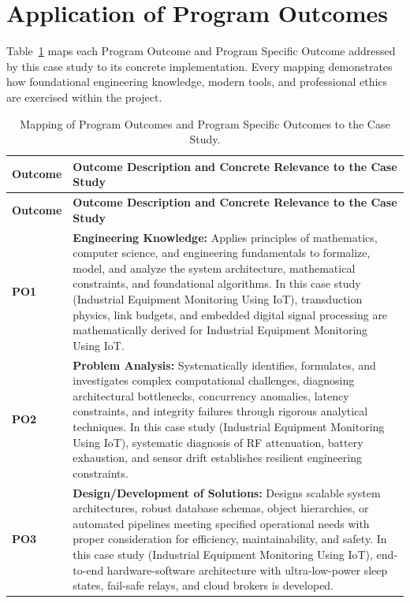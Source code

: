 \section{Application of Program Outcomes}
Table~\ref{tab:po} maps each Program Outcome and Program Specific Outcome addressed by this case study to its concrete implementation. Every mapping demonstrates how foundational engineering knowledge, modern tools, and professional ethics are exercised within the project.

{\small
\begin{longtable}{@{}>{\centering\arraybackslash}p{1.8cm} p{13.2cm}@{}}
    \caption{Mapping of Program Outcomes and Program Specific Outcomes to the Case Study.}\label{tab:po}\\
    \toprule
    \textbf{Outcome} & \textbf{Outcome Description and Concrete Relevance to the Case Study} \\
    \midrule
    \endfirsthead
    \toprule
    \textbf{Outcome} & \textbf{Outcome Description and Concrete Relevance to the Case Study} \\
    \midrule
    \endhead
\textbf{PO1} & \textbf{Engineering Knowledge:} Applies principles of mathematics, computer science, and engineering fundamentals to formalize, model, and analyze the system architecture, mathematical constraints, and foundational algorithms. In this case study (Industrial Equipment Monitoring Using IoT), transduction physics, link budgets, and embedded digital signal processing are mathematically derived for Industrial Equipment Monitoring Using IoT. \\
    \addlinespace
\textbf{PO2} & \textbf{Problem Analysis:} Systematically identifies, formulates, and investigates complex computational challenges, diagnosing architectural bottlenecks, concurrency anomalies, latency constraints, and integrity failures through rigorous analytical techniques. In this case study (Industrial Equipment Monitoring Using IoT), systematic diagnosis of RF attenuation, battery exhaustion, and sensor drift establishes resilient engineering constraints. \\
    \addlinespace
\textbf{PO3} & \textbf{Design/Development of Solutions:} Designs scalable system architectures, robust database schemas, object hierarchies, or automated pipelines meeting specified operational needs with proper consideration for efficiency, maintainability, and safety. In this case study (Industrial Equipment Monitoring Using IoT), end-to-end hardware-software architecture with ultra-low-power sleep states, fail-safe relays, and cloud brokers is developed. \\

\end{longtable}}
